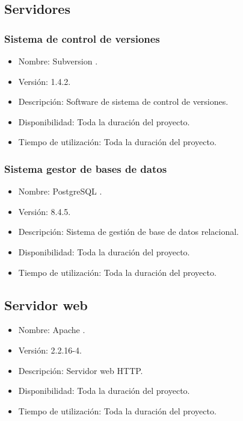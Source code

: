    \subsection{Servidores}

      \subsubsection{Sistema de control de versiones}

         \begin{itemize}
            \item Nombre: Subversion \cite{subversion}.
            \item Versión: 1.4.2.
            \item Descripción: Software de sistema de control de versiones.
            \item Disponibilidad: Toda la duración del proyecto.
            \item Tiempo de utilización: Toda la duración del proyecto.
         \end{itemize}

      \subsubsection{Sistema gestor de bases de datos}

         \begin{itemize}
          \item Nombre: PostgreSQL \cite{postgresql}.
          \item Versión: 8.4.5.
          \item Descripción: Sistema de gestión de base de datos relacional.
          \item Disponibilidad: Toda la duración del proyecto.
          \item Tiempo de utilización: Toda la duración del proyecto.
         \end{itemize}

      \subsection{Servidor web}

         \begin{itemize}
          \item Nombre: Apache \cite{apache}.
          \item Versión: 2.2.16-4.
          \item Descripción: Servidor web HTTP.
          \item Disponibilidad: Toda la duración del proyecto.
          \item Tiempo de utilización: Toda la duración del proyecto.
         \end{itemize}
